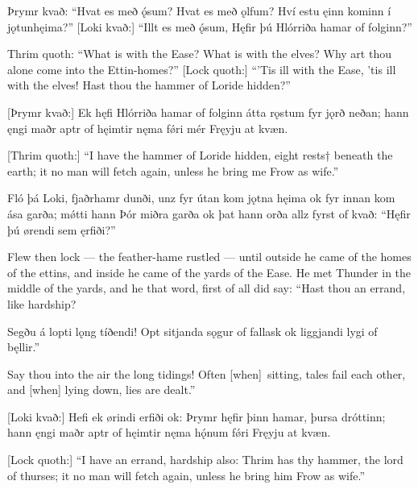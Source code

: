 Þrymr kvað:
“Hvat es með ǫ́sum? \hld Hvat es með ǫlfum?
Hví estu ęinn kominn \hld í jǫtunhęima?”
[Loki kvað:]
“Illt es með ǫ́sum, \footnotemark[1]
Hęfir þú Hlórriða \hld hamar of folginn?”

Thrim quoth:
“What is with the Ease? What is with the elves? Why art thou alone come into the Ettin-homes?”
[Lock quoth:]
“'Tis ill with the Ease, 'tis ill with the elves! Hast thou the hammer of Loride hidden?”

[Þrymr kvað:]
Ek hęfi Hlórriða \hld hamar of folginn
átta rǫstum \hld fyr jǫrð neðan;
hann ęngi maðr \hld aptr of hęimtir
nęma fǿri mér \hld Fręyju at kvæn.

[Thrim quoth:]
“I have the hammer of Loride hidden, eight rests† beneath the earth; it no man will fetch again, unless he bring me Frow as wife.”

Fló þá Loki, \hld fjaðrhamr dunði,
unz fyr útan kom \hld jǫtna hęima
ok fyr innan kom \hld ása garða;
mǿtti hann Þór \hld miðra garða
ok þat hann orða \hld allz fyrst of kvað:
“Hęfir þú ørendi \hld sem ęrfiði?”

Flew then lock — the feather-hame rustled — until outside he came of the homes of the ettins, and inside he came of the yards of the Ease. He met Thunder in the middle of the yards, and he that word, first of all did say: “Hast thou an errand, like hardship?\footnotemark[1]

Segðu á lopti \hld lǫng tíðendi!
Opt sitjanda \hld sǫgur of fallask
ok liggjandi \hld lygi of bęllir.”

Say thou into the air the long tidings! Often [when] sitting, tales fail each other, and [when] lying down, lies are dealt.”\footnotemark[1]

[Loki kvað:]
Hefi ek ørindi \hld erfiði ok:
Þrymr hęfir þinn hamar, \hld þursa dróttinn;
hann ęngi maðr \hld aptr of hęimtir
nęma hǫ́num fǿri \hld Fręyju at kvæn.

[Lock quoth:]
“I have an errand, hardship also: Thrim has thy hammer, the lord of thurses; it no man will fetch again, unless he bring him Frow as wife.”

